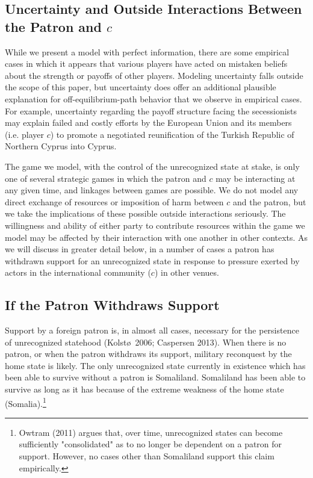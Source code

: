 \documentclass[11pt,letterpaper, notitlepage]{article}
\begin{document}
\subsection{Uncertainty and Outside Interactions Between the Patron and \texorpdfstring{$c$}{c}}
While we present a model with perfect information, there are some empirical cases in which it appears that various players have acted on mistaken beliefs about the strength or payoffs of other players. Modeling uncertainty falls outside the scope of this paper, but uncertainty does offer an additional plausible explanation for off-equilibrium-path behavior that we observe in empirical cases.  For example, uncertainty regarding the payoff structure facing the secessionists may explain failed and costly efforts by the European Union and its members (i.e. player $c$) to promote a negotiated reunification of the Turkish Republic of Northern Cyprus into Cyprus. 

The game we model, with the control of the unrecognized state at stake, is only one of several strategic games in which the patron and $c$ may be interacting at any given time, and linkages between games are possible. We do not model any direct exchange of resources or imposition of harm between $c$ and the patron, but we take the implications of these possible outside interactions seriously. The willingness and ability of either party to contribute resources within the game we model may be affected by their interaction with one another in other contexts. As we will discuss in greater detail below, in a number of cases a patron has withdrawn support for an unrecognized state in response to pressure exerted by actors in the international community ($c$) in other venues.


\subsection{If the Patron Withdraws Support}
Support by a foreign patron is, in almost all cases, necessary for the persistence of unrecognized statehood (Kolst\o \ 2006; Caspersen 2013). When there is no patron, or when the patron withdraws its support, military reconquest by the home state is likely. The only unrecognized state currently in existence which has been able to survive without a patron is Somaliland. Somaliland has been able to survive as long as it has because of the extreme weakness of the home state (Somalia).\footnote{Owtram (2011) argues that, over time, unrecognized states can become sufficiently "consolidated" as to no longer be dependent on a patron for support. However, no cases other than Somaliland support this claim empirically.}
\end{document}
